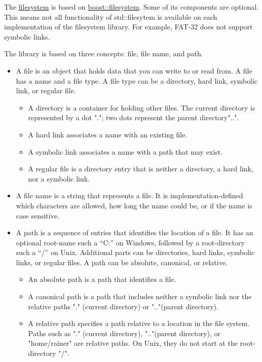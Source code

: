 
The \href{http://en.cppreference.com/w/cpp/filesystem}{filesystem} is based on \href{http://www.boost.org/doc/libs/1_65_1/libs/filesystem/doc/index.htm}{boost::filesystem}. Some of its components are optional. This means not all functionality of std::filesytem is available on each implementation of the filesystem library. For example, FAT-32 does not support symbolic links.

The library is based on three concepts: file, file name, and path.

\begin{itemize}
\item 
A file is an object that holds data that you can write to or read from. A file has a name and a file type. A file type can be a directory, hard link, symbolic link, or regular file.

\begin{itemize}
\item 
A directory is a container for holding other files. The current directory is represented by a dot "."; two dots represent the parent directory"..".

\item 
A hard link associates a name with an existing file.

\item 
A symbolic link associates a name with a path that may exist.

\item 
A regular file is a directory entry that is neither a directory, a hard link, nor a symbolic link.
\end{itemize}

\item 
A file name is a string that represents a file. It is implementation-defined which characters are allowed, how long the name could be, or if the name is case sensitive.

\item 
A path is a sequence of entries that identifies the location of a file. It has an optional root-name such a “C:” on Windows, followed by a root-directory such a “/” on Unix. Additional parts can be directories, hard links, symbolic links, or regular files. A path can be absolute, canonical, or relative.

\begin{itemize}
\item 
An absolute path is a path that identifies a file.

\item 
A canonical path is a path that includes neither a symbolic link nor the relative paths "." (current directory) or ".."(parent directory).

\item 
A relative path specifies a path relative to a location in the file system. Paths such as "." (current directory), ".."(parent directory), or "home/rainer" are relative paths. On Unix, they do not start at the root-directory "/".
\end{itemize}
\end{itemize}

